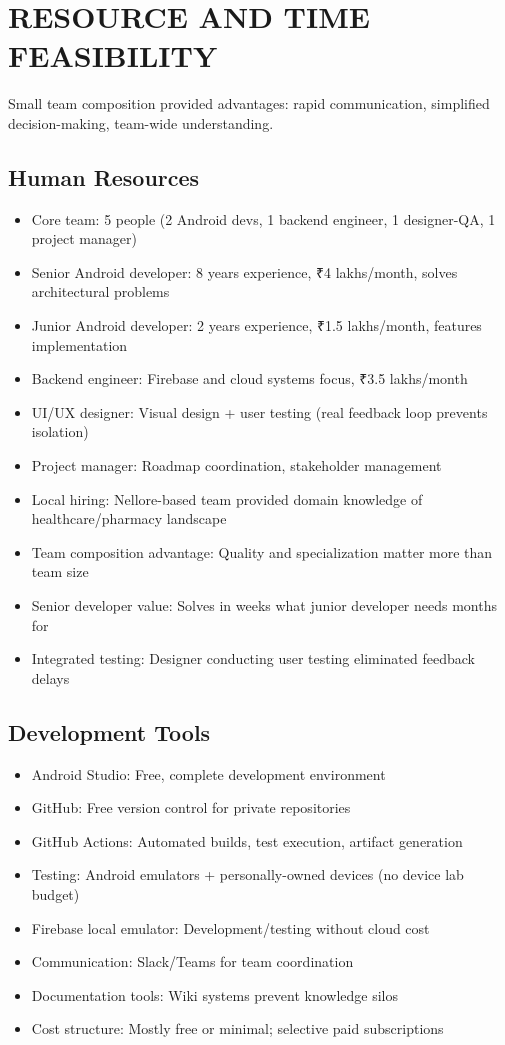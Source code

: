 \documentclass[12pt,a4paper]{report}
\begin{document}
\section{RESOURCE AND TIME FEASIBILITY}

Small team composition provided advantages: rapid communication, simplified decision-making, team-wide understanding.

\subsection{Human Resources}

\begin{itemize}
  \item Core team: 5 people (2 Android devs, 1 backend engineer, 1 designer-QA, 1 project manager)
  \item Senior Android developer: 8 years experience, ₹4 lakhs/month, solves architectural problems
  \item Junior Android developer: 2 years experience, ₹1.5 lakhs/month, features implementation
  \item Backend engineer: Firebase and cloud systems focus, ₹3.5 lakhs/month
  \item UI/UX designer: Visual design + user testing (real feedback loop prevents isolation)
  \item Project manager: Roadmap coordination, stakeholder management
  \item Local hiring: Nellore-based team provided domain knowledge of healthcare/pharmacy landscape
  \item Team composition advantage: Quality and specialization matter more than team size
  \item Senior developer value: Solves in weeks what junior developer needs months for
  \item Integrated testing: Designer conducting user testing eliminated feedback delays
\end{itemize}

\subsection{Development Tools}

\begin{itemize}
  \item Android Studio: Free, complete development environment
  \item GitHub: Free version control for private repositories
  \item GitHub Actions: Automated builds, test execution, artifact generation
  \item Testing: Android emulators + personally-owned devices (no device lab budget)
  \item Firebase local emulator: Development/testing without cloud cost
  \item Communication: Slack/Teams for team coordination
  \item Documentation tools: Wiki systems prevent knowledge silos
  \item Cost structure: Mostly free or minimal; selective paid subscriptions
\end{itemize}
\end{document}
